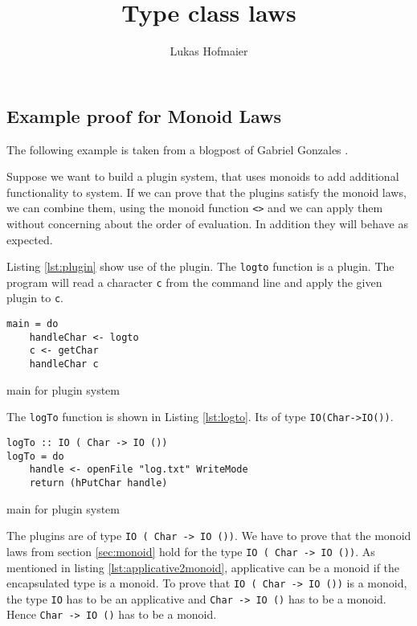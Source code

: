 \documentclass[twoside, a4paper]{article}
\author{Lukas Hofmaier}
\title{Type class laws}
\begin{document}
\maketitle
\tableofcontents





\subsection{Example proof for Monoid Laws}
\label{sec:example}

The following example is taken from a blogpost of Gabriel Gonzales \cite{gonzales14}. 

Suppose we want to build a plugin system, that uses monoids to add additional functionality to system. If we can prove that the plugins satisfy the monoid laws, we can combine them, using the monoid function \verb|<>| and we can apply them without concerning about the order of evaluation. In addition they will behave as expected. 

Listing \ref{lst:plugin} show use of the plugin. The \verb|logto| function is a plugin. The program will read a character \verb|c| from the command line and apply the given plugin to \verb|c|.

\begin{program}
\begin{verbatim}
main = do
    handleChar <- logto
    c <- getChar
    handleChar c
\end{verbatim}
\label{lst:plugin}
\caption{main for plugin system}
\end{program}

The \verb|logTo| function is shown in Listing \ref{lst:logto}. Its of type \verb|IO(Char->IO())|. 

\begin{program}
\begin{verbatim}
logTo :: IO ( Char -> IO ())
logTo = do
    handle <- openFile "log.txt" WriteMode
    return (hPutChar handle)
\end{verbatim}
\label{lst:logto}
\caption{main for plugin system}
\end{program}

The plugins are of type \verb|IO ( Char -> IO ())|. We have to  prove that the monoid laws from section \ref{sec:monoid} hold for the type \verb|IO ( Char -> IO ())|.
As mentioned in listing \ref{lst:applicative2monoid}, applicative can be a monoid if the encapsulated type is a monoid. To prove that \verb|IO ( Char -> IO ())| is a monoid, the type \verb|IO| has to be an applicative and \verb|Char -> IO ()| has to be a monoid. Hence \verb|Char -> IO ()| has to be a monoid.
\end{document}
